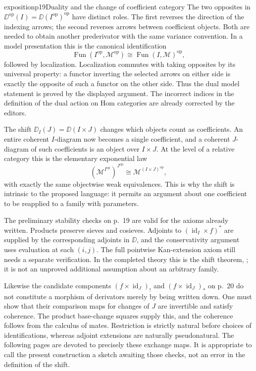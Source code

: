 \begin{dcomment}{exposition}{p19}{Duality and the change of coefficient category}
The two opposites in $\DD^{\mathrm{op}}(I)=\DD(I^{\mathrm{op}})^{\mathrm{op}}$ have distinct roles. The first reverses the direction of the indexing arrows; the second reverses arrows between coefficient objects. Both are needed to obtain another prederivator with the same variance convention. In a model presentation this is the canonical identification
\[
 \operatorname{Fun}(I^{\mathrm{op}},\mathcal M^{\mathrm{op}})
 \cong\operatorname{Fun}(I,\mathcal M)^{\mathrm{op}},
\]
followed by localization. Localization commutes with taking opposites by its universal property: a functor inverting the selected arrows on either side is exactly the opposite of such a functor on the other side. Thus the dual model statement is proved by the displayed argument. The incorrect indices in the definition of the dual action on Hom categories are already corrected by the editors.

The shift $\DD_I(J)=\DD(I\times J)$ changes which objects count as coefficients. An entire coherent $I$-diagram now becomes a single coefficient, and a coherent $J$-diagram of such coefficients is an object over $I\times J$. At the level of a relative category this is the elementary exponential law
\[
 (\mathcal M^{I^{\mathrm{op}}})^{J^{\mathrm{op}}}
 \cong\mathcal M^{(I\times J)^{\mathrm{op}}},
\]
with exactly the same objectwise weak equivalences. This is why the shift is intrinsic to the proposed language: it permits an argument about one coefficient to be reapplied to a family with parameters.

The preliminary stability checks on p.~19 are valid for the axioms already written. Products preserve sieves and cosieves. Adjoints to $(\operatorname{id}_I\times f)^*$ are supplied by the corresponding adjoints in $\DD$, and the conservativity argument uses evaluation at each $(i,j)$. The full pointwise Kan-extension axiom still needs a separate verification. In the completed theory this is the shift theorem, \citet[Theorem~1.25]{Groth2013}; it is not an unproved additional assumption about an arbitrary family.

Likewise the candidate components $(f\times\operatorname{id}_J)_!$ and $(f\times\operatorname{id}_J)_*$ on p.~20 do not constitute a morphism of derivators merely by being written down. One must show that their comparison maps for changes of $J$ are invertible and satisfy coherence. The product base-change squares supply this, and the coherence follows from the calculus of mates. Restriction is strictly natural before choices of identifications, whereas adjoint extensions are naturally pseudonatural. The following pages are devoted to precisely these exchange maps. It is appropriate to call the present construction a sketch awaiting those checks, not an error in the definition of the shift.
\end{dcomment}


